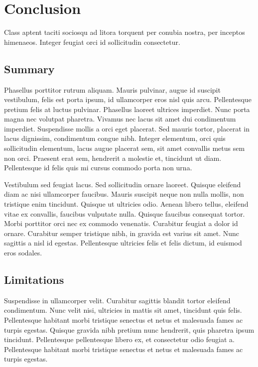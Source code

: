 %
\section{Conclusion}
\label{sec:conclusion}
%

Class aptent taciti sociosqu ad litora torquent per conubia nostra, per inceptos himenaeos. Integer feugiat orci id sollicitudin consectetur.

%
\subsection{Summary}
\label{subsec:summary}
%

Phasellus porttitor rutrum aliquam. Mauris pulvinar, augue id suscipit vestibulum, felis est porta ipsum, id ullamcorper eros nisl quis arcu. Pellentesque pretium felis at luctus pulvinar. Phasellus laoreet ultrices imperdiet. Nunc porta magna nec volutpat pharetra. Vivamus nec lacus sit amet dui condimentum imperdiet. Suspendisse mollis a orci eget placerat. Sed mauris tortor, placerat in lacus dignissim, condimentum congue nibh. Integer elementum, orci quis sollicitudin elementum, lacus augue placerat sem, sit amet convallis metus sem non orci. Praesent erat sem, hendrerit a molestie et, tincidunt ut diam. Pellentesque id felis quis mi cursus commodo porta non urna. 

Vestibulum sed feugiat lacus. Sed sollicitudin ornare laoreet. Quisque eleifend diam ac nisi ullamcorper faucibus. Mauris suscipit neque non nulla mollis, non tristique enim tincidunt. Quisque ut ultricies odio. Aenean libero tellus, eleifend vitae ex convallis, faucibus vulputate nulla. Quisque faucibus consequat tortor. Morbi porttitor orci nec ex commodo venenatis. Curabitur feugiat a dolor id ornare. Curabitur semper tristique nibh, in gravida est varius sit amet. Nunc sagittis a nisl id egestas. Pellentesque ultricies felis et felis dictum, id euismod eros sodales.

%
\subsection{Limitations}
\label{subsec:limitations}
%

Suspendisse in ullamcorper velit. Curabitur sagittis blandit tortor eleifend condimentum. Nunc velit nisi, ultricies in mattis sit amet, tincidunt quis felis. Pellentesque habitant morbi tristique senectus et netus et malesuada fames ac turpis egestas. Quisque gravida nibh pretium nunc hendrerit, quis pharetra ipsum tincidunt. Pellentesque pellentesque libero ex, et consectetur odio feugiat a. Pellentesque habitant morbi tristique senectus et netus et malesuada fames ac turpis egestas.
